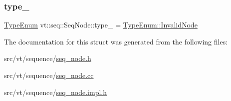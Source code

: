 \subsubsection{\texorpdfstring{type\+\_\+}{type\_}}
{\footnotesize\ttfamily \hyperlink{namespacevt_1_1seq_ae721d4e8b95cf57a7e4169db1929e0f1}{Type\+Enum} vt\+::seq\+::\+Seq\+Node\+::type\+\_\+ = \hyperlink{namespacevt_1_1seq_ae721d4e8b95cf57a7e4169db1929e0f1a8d430d6250b6f558562aace5b6a5a8de}{Type\+Enum\+::\+Invalid\+Node}\hspace{0.3cm}{\ttfamily [private]}}



The documentation for this struct was generated from the following files\+:\begin{DoxyCompactItemize}
\item 
src/vt/sequence/\hyperlink{seq__node_8h}{seq\+\_\+node.\+h}\item 
src/vt/sequence/\hyperlink{seq__node_8cc}{seq\+\_\+node.\+cc}\item 
src/vt/sequence/\hyperlink{seq__node_8impl_8h}{seq\+\_\+node.\+impl.\+h}\end{DoxyCompactItemize}
